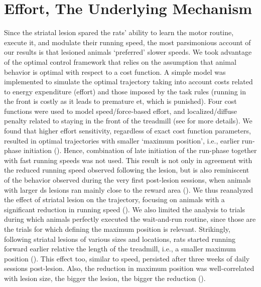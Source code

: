 \section{Effort, The Underlying Mechanism}
\label{ch:lesion:effort}

Since the striatal lesion spared the rats' ability to learn the motor routine, execute it, and modulate their running speed, the most parsimonious account of our results is that lesioned animals `preferred' slower speeds.
We took advantage of the optimal control framework that relies on the assumption that animal behavior is optimal with respect to a cost function.
A simple model was implemented to simulate the optimal trajectory taking into account costs related to energy expenditure (effort) and those imposed by the task rules (running in the front is costly as it leads to premature \gls{et}, which is punished).
Four cost functions were used to model speed/force-based effort, and localized/diffuse penalty related to staying in the front of the treadmill (see \cite{JuradoParras2020} for more details).
We found that higher effort sensitivity, regardless of exact cost function parameters, resulted in optimal trajectories with smaller `maximum position', i.e., earlier run-phase initiation ().
Hence, combination of late initiation of the run-phase together with fast running speeds was not used.
This result is not only in agreement with the reduced running speed observed following the lesion, but is also reminiscent of the behavior observed during the very first post-lesion sessions, when animals with larger \gls{ds} lesions ran mainly close to the reward area (). 
We thus reanalyzed the effect of striatal lesion on the trajectory, focusing on animals with a significant reduction in running speed ().
We also limited the analysis to trials during which animals perfectly executed the wait-and-run routine, since those are the trials for which defining the maximum position is relevant.
Strikingly, following striatal lesions of various sizes and locations, rats started running forward earlier relative the length of the treadmill, i.e., a smaller maximum position ().
This effect too, similar to speed, persisted after three weeks of daily sessions post-lesion.
Also, the reduction in maximum position was well-correlated with lesion size, the bigger the lesion, the bigger the reduction ().